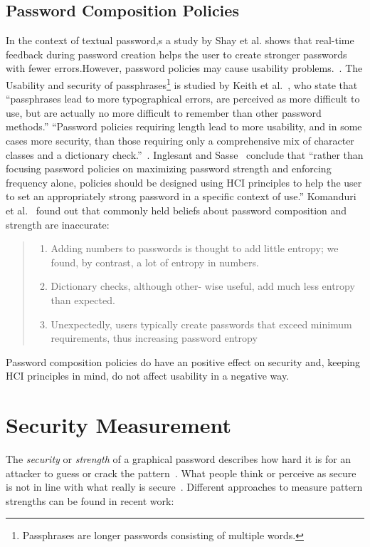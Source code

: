 \documentclass[twocolumn, a4paper, 10pt]{article}
\begin{document}
\subsection{Password Composition Policies}
\label{sec:related:policies}
In the context of textual password,s a study by Shay et al. shows that real-time feedback during password creation helps the user to create stronger passwords with fewer errors.However, password policies may cause usability problems.~\cite{Shay:2015:SSI:2702123.2702586}. The Usability and security of passphrases\footnote{Passphrases are longer passwords consisting of multiple words.} is studied by Keith et al.~\cite{Keith200717}, who state that ``passphrases lead to more typographical errors, are perceived as more difficult to use, but are actually no more difficult to remember than other password methods.'' ``Password policies requiring length lead to more usability, and in some cases more security, than those requiring only a comprehensive mix of character classes and a dictionary check.''~\cite{Shay:2014:LPS:2556288.2557377}. Inglesant and Sasse~\cite{Inglesant:2010:TCU:1753326.1753384} conclude that ``rather than focusing password policies on maximizing password strength and enforcing frequency alone, policies should be designed using HCI principles to help the user to set an appropriately strong password in a specific context of use.'' Komanduri et al.~\cite{Komanduri:2011:PPM:1978942.1979321} found out that commonly held beliefs about password composition and strength are inaccurate:
\begin{quote}
	\small
	\begin{enumerate}
		\setlength\itemsep{0em}
		\item Adding numbers to passwords is thought to add little entropy; we found, by contrast, a lot of entropy in numbers.
		\item Dictionary checks, although other- wise useful, add much less entropy than expected.
		\item Unexpectedly, users typically create passwords that exceed minimum requirements, thus increasing password entropy
	\end{enumerate}
\end{quote}

Password composition policies do have an positive effect on security and, keeping HCI principles in mind, do not affect usability in a negative way.


\section{Security Measurement}
\label{sec:security}
The \emph{security} or \emph{strength} of a graphical password describes how hard it is for an attacker to guess or crack the pattern~\cite{Keith200717}. What people think or perceive as secure is not in line with what really is secure~\cite{Aviv:2014:UVP:2664243.2664253}. Different approaches to measure pattern strengths can be found in recent work:
\end{document}
